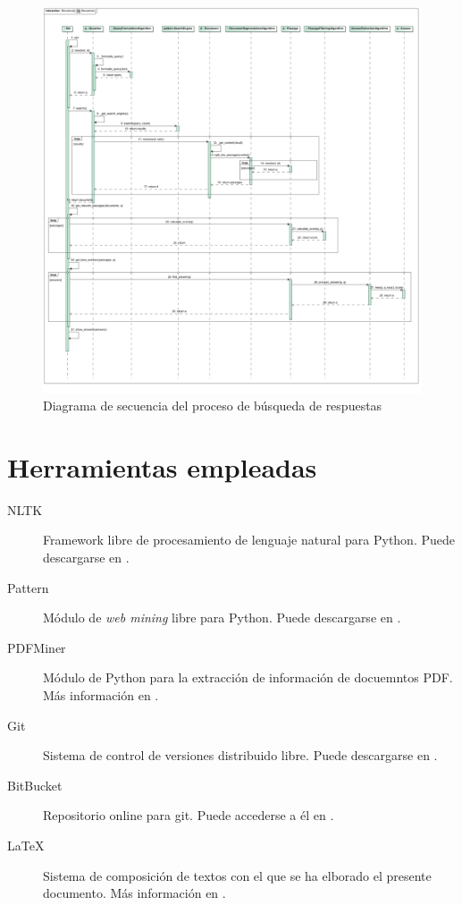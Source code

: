 \documentclass[12pt,a4paper,titlepage]{article}
\begin{document}
\begin{figure}[h!]
\begin{center}
\includegraphics[width=\textwidth]{res/secuencia}
\end{center}
\caption{Diagrama de secuencia del proceso de búsqueda de respuestas}
\label{fig:secuencia}
\end{figure}

\clearpage
\section{Herramientas empleadas}


\begin{description}
	\item[NLTK] Framework libre de procesamiento de lenguaje natural para Python. Puede descargarse en \cite{nltk}.
	\item[Pattern] Módulo de \emph{web mining} libre para Python. Puede descargarse en \cite{pattern}.
	\item[PDFMiner] Módulo de Python para la extracción de información de docuemntos PDF. Más información en \cite{pdfminer}.
	\item[Git] Sistema de control de versiones distribuido libre. Puede descargarse en \cite{git}.
	\item[BitBucket] Repositorio online para git. Puede accederse a él en \cite{bitbucket}.
	\item[\LaTeX] Sistema de composición de textos con el que se ha elborado el presente documento. Más información en \cite{latex}.
	
\end{description}
\end{document}
